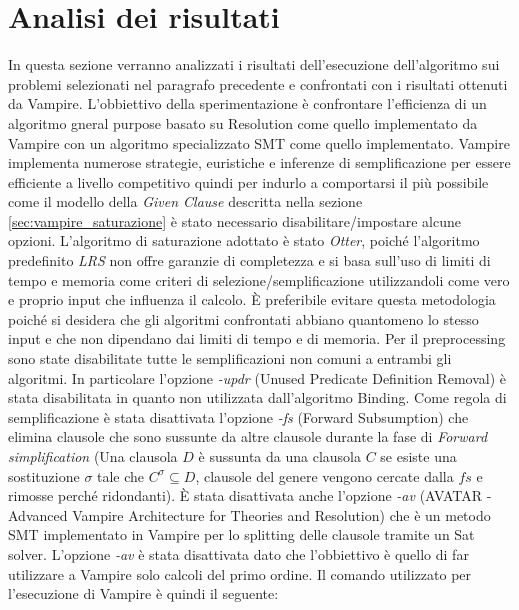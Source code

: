 \documentclass[./main.tex]{subfiles}
\begin{document}
\section{Analisi dei risultati}
In questa sezione verranno analizzati i risultati dell'esecuzione dell'algoritmo sui problemi selezionati nel paragrafo precedente
e confrontati con i risultati ottenuti da Vampire. 
L'obbiettivo della sperimentazione è confrontare l'efficienza di un algoritmo gneral purpose basato su Resolution come quello implementato da Vampire
con un algoritmo specializzato SMT come quello implementato.
Vampire implementa numerose strategie, euristiche e inferenze di semplificazione per essere efficiente a livello competitivo
quindi per indurlo a comportarsi il più possibile come il modello della \textit{Given Clause} descritta 
nella sezione \ref{sec:vampire_saturazione} è stato necessario disabilitare/impostare alcune opzioni.
L'algoritmo di saturazione adottato è stato \textit{Otter}, 
poiché l'algoritmo predefinito \textit{LRS} non offre garanzie di completezza e
si basa sull'uso di limiti di tempo e memoria come criteri di selezione/semplificazione 
utilizzandoli come vero e proprio input che influenza il calcolo. 
È preferibile evitare questa metodologia poiché si desidera che gli algoritmi confrontati abbiano quantomeno lo stesso input
e che non dipendano dai limiti di tempo e di memoria.
Per il preprocessing sono state disabilitate tutte le semplificazioni non comuni a entrambi gli algoritmi.
In particolare l'opzione \textit{-updr} (Unused Predicate Definition Removal) è stata disabilitata in quanto non utilizzata dall'algoritmo
Binding. 
Come regola di semplificazione è stata disattivata l'opzione \textit{-fs} (Forward Subsumption) che elimina 
clausole che sono sussunte da altre clausole durante la fase di \textit{Forward simplification} 
(Una clausola $D$ è sussunta da una clausola $C$ se esiste una sostituzione $\sigma$ tale che 
$C^\sigma \subseteq D$, clausole del genere vengono cercate dalla $fs$ e rimosse perché ridondanti).
È stata disattivata anche l'opzione \textit{-av} (AVATAR - Advanced Vampire Architecture
for Theories and Resolution) che è un metodo SMT implementato in Vampire per lo splitting delle clausole tramite un Sat solver.
L'opzione \textit{-av} è stata disattivata dato che l'obbiettivo è quello di far utilizzare a Vampire solo calcoli del primo ordine.
Il comando utilizzato per l'esecuzione di Vampire è quindi il seguente:
\end{document}
